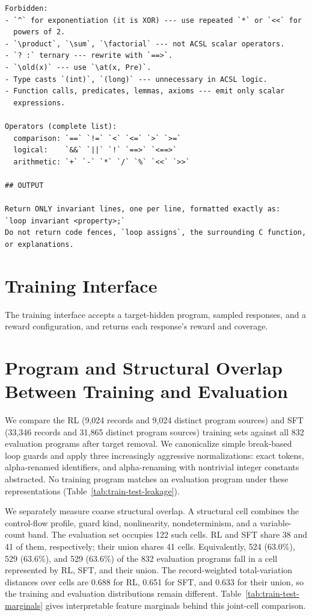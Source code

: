 \begin{promptbox}
\begin{lstlisting}[style=promptstyle]
Forbidden:
- `^` for exponentiation (it is XOR) --- use repeated `*` or `<<` for
  powers of 2.
- `\product`, `\sum`, `\factorial` --- not ACSL scalar operators.
- `? :` ternary --- rewrite with `==>`.
- `\old(x)` --- use `\at(x, Pre)`.
- Type casts `(int)`, `(long)` --- unnecessary in ACSL logic.
- Function calls, predicates, lemmas, axioms --- emit only scalar
  expressions.

Operators (complete list):
  comparison: `==` `!=` `<` `<=` `>` `>=`
  logical:    `&&` `||` `!` `==>` `<==>`
  arithmetic: `+` `-` `*` `/` `%` `<<` `>>`

## OUTPUT

Return ONLY invariant lines, one per line, formatted exactly as:
`loop invariant <property>;`
Do not return code fences, `loop assigns`, the surrounding C function,
or explanations.
\end{lstlisting}
\end{promptbox}

\section{Training Interface}
\label{app:service}

The training interface accepts a target-hidden program, sampled responses,
and a reward configuration, and returns each response's reward and coverage.

\section{Program and Structural Overlap Between Training and Evaluation}
\label{app:data-leakage}

We compare the RL (9,024 records and 9,024 distinct program sources)
and SFT (33,346 records and 31,865 distinct program sources) training sets
against all 832 evaluation programs after target removal.  We canonicalize
simple break-based loop guards and apply three increasingly aggressive
normalizations: exact tokens, alpha-renamed identifiers, and alpha-renaming
with nontrivial integer constants abstracted.  No training program matches
an evaluation program under these representations
(Table~\ref{tab:train-test-leakage}).

We separately measure coarse structural overlap.  A structural cell combines
the control-flow profile, guard kind, nonlinearity, nondeterminism, and a
variable-count band.  The evaluation set occupies 122 such cells.  RL and SFT
share 38 and 41 of them, respectively; their union shares 41 cells.
Equivalently, 524 (63.0\%), 529 (63.6\%), and 529 (63.6\%) of the 832
evaluation programs fall in a cell represented by RL, SFT, and their union.
The record-weighted total-variation distances over cells are 0.688 for RL,
0.651 for SFT, and 0.633 for their union, so the training and evaluation
distributions remain different.  Table~\ref{tab:train-test-marginals} gives
interpretable feature marginals behind this joint-cell comparison.

